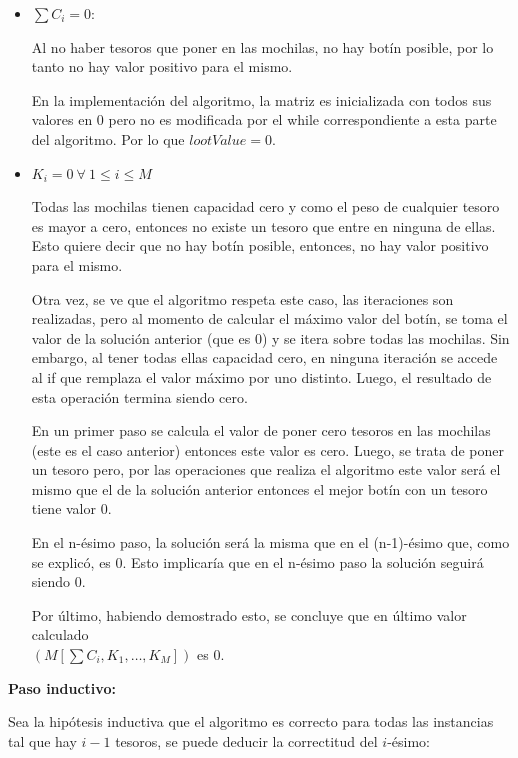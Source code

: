 \begin{itemize}
\item $\sum C_i = 0$:
    
    Al no haber tesoros que poner en las mochilas, no hay botín posible, por lo tanto no hay valor positivo para el mismo.
    
    En la implementación del algoritmo, la matriz es inicializada con todos sus valores en $0$ pero no es modificada por el while correspondiente a esta parte del algoritmo. Por lo que $lootValue = 0$.
    
\item $K_i = 0 ~\forall~ 1\leq i \leq M$

    Todas las mochilas tienen capacidad cero y como el peso de cualquier tesoro es mayor a cero, entonces no existe un tesoro que entre en ninguna de ellas. Esto quiere decir que no hay botín posible, entonces, no hay valor positivo para el mismo.
    
    Otra vez, se ve que el algoritmo respeta este caso, las iteraciones son realizadas, pero al momento de calcular el máximo valor del botín, se toma el valor de la solución anterior (que es 0) y se itera sobre todas las mochilas. Sin embargo, al tener todas ellas capacidad cero, en ninguna iteración se accede al if que remplaza el valor máximo por uno distinto. Luego, el resultado de esta operación termina siendo cero.
    
    En un primer paso se calcula el valor de poner cero tesoros en las mochilas (este es el caso anterior) entonces este valor es cero. Luego, se trata de poner un tesoro pero, por las operaciones que realiza el algoritmo este valor será el mismo que el de la solución anterior entonces el mejor botín con un tesoro tiene valor 0.
    
    En el n-ésimo paso, la solución será la misma que en el (n-1)-ésimo que, como se explicó, es 0. Esto implicaría que en el n-ésimo paso la solución seguirá siendo 0.
    
    Por último, habiendo demostrado esto, se concluye que en último valor calculado \\ $\left(M\left[\sum C_i, K_1, \dots, K_M\right]\right)$ es 0.
\end{itemize}

\textbf{Paso inductivo:}

    Sea la hipótesis inductiva que el algoritmo es correcto para todas las instancias tal que hay $i-1$ tesoros, se puede deducir la correctitud del $i$-ésimo:
    
